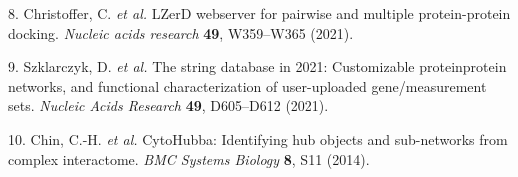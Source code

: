 \documentclass[
]{article}
\newenvironment{cslreferences}%
  {}%
  {\par}
\begin{document}
\begin{cslreferences}
\leavevmode\hypertarget{ref-LzerdWebserverChrist2021}{}%
8. Christoffer, C. \emph{et al.} LZerD webserver for pairwise and multiple protein-protein docking. \emph{Nucleic acids research} \textbf{49}, W359--W365 (2021).

\leavevmode\hypertarget{ref-TheStringDataSzklar2021}{}%
9. Szklarczyk, D. \emph{et al.} The string database in 2021: Customizable proteinprotein networks, and functional characterization of user-uploaded gene/measurement sets. \emph{Nucleic Acids Research} \textbf{49}, D605--D612 (2021).

\leavevmode\hypertarget{ref-CytohubbaIdenChin2014}{}%
10. Chin, C.-H. \emph{et al.} CytoHubba: Identifying hub objects and sub-networks from complex interactome. \emph{BMC Systems Biology} \textbf{8}, S11 (2014).
\end{cslreferences}
\end{document}
